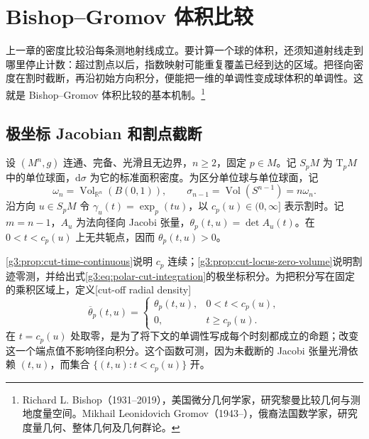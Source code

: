 
% 
% 

\section{Bishop–Gromov 体积比较}
\label{g3:sec:0802}

上一章的密度比较沿每条测地射线成立。要计算一个球的体积，还须知道射线走到哪里停止计数：超过割点以后，指数映射可能重复覆盖已经到达的区域。把径向密度在割时截断，再沿初始方向积分，便能把一维的单调性变成球体积的单调性。这就是 Bishop–Gromov 体积比较的基本机制。\footnote{Richard L. Bishop（1931--2019），美国微分几何学家，研究黎曼比较几何与测地度量空间。Mikhail Leonidovich Gromov（1943--），俄裔法国数学家，研究度量几何、整体几何及几何群论。}

\subsection{极坐标 Jacobian 和割点截断}
\label{g3:subsec:0802:01}

设 \((M^n,g)\) 连通、完备、光滑且无边界，\(n\ge2\)，固定 \(p\in M\)。记 \(S_pM\) 为 \(\mathrm T_pM\) 中的单位球面，\(\mathrm d\sigma\) 为它的标准面积密度。为区分单位球与单位球面，记
\[
	\omega_n=\operatorname{Vol}_{\mathbb R^n}(B(0,1)),\qquad
	\sigma_{n-1}=\operatorname{Vol}(S^{n-1})=n\omega_n.
\]
沿方向 \(u\in S_pM\) 令 \(\gamma_u(t)=\exp_p(tu)\)，以 \(c_p(u)\in(0,\infty]\) 表示割时。记 \(m=n-1\)，\(A_u\) 为法向径向 Jacobi 张量，\(\theta_p(t,u)=\det A_u(t)\)。在 \(0<t<c_p(u)\) 上无共轭点，因而 \(\theta_p(t,u)>0\)。

\ProseParagraphBreak

\cref{g3:prop:cut-time-continuous}说明 \(c_p\) 连续；\cref{g3:prop:cut-locus-zero-volume}说明割迹零测，并给出式\eqref{g3:eq:polar-cut-integration}的极坐标积分。为把积分写在固定的乘积区域上，定义[cut-off radial density]
\begin{equation}\label{g3:eq:cut-truncated-radial-density}
	\overline\theta_p(t,u)=
	\begin{cases}
		\theta_p(t,u),&0<t<c_p(u),\\
		0,&t\ge c_p(u).
	\end{cases}
\end{equation}
在 \(t=c_p(u)\) 处取零，是为了将下文的单调性写成每个时刻都成立的命题；改变这一个端点值不影响径向积分。这个函数可测，因为未截断的 Jacobi 张量光滑依赖 \((t,u)\)，而集合 \(\{(t,u):t<c_p(u)\}\) 开。

